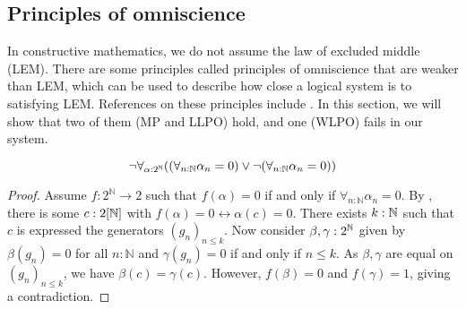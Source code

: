 \subsection{Principles of omniscience}
In constructive mathematics, we do not assume the law of excluded middle (LEM).
There are some principles called principles of omniscience that are weaker than LEM, which can be used to describe 
how close a logical system is to satisfying LEM.
References on these principles include \cite{HannesDiener, ReverseMathsBishop}.
In this section, we will show that two of them (MP and LLPO) hold, 
and one (WLPO) fails in our system.

\begin{theorem}\label{NotWLPO}
  \begin{equation}
    \neg \forall_{\alpha:2^{\mathbb{N}}} 
    ((\forall_{n:\mathbb{N}} \alpha_n = 0 ) \vee \neg (\forall_{n:\mathbb{N}} \alpha_n = 0))
  \end{equation}
\end{theorem}
\begin{proof}
  Assume $f:2^\mathbb N \to 2$ such that 
  $f(\alpha) = 0$ if and only if $\forall_{n:\mathbb N} \alpha_n= 0$. 
  By , there is some $c:2[\mathbb{N}]$ with 
  $f(\alpha) = 0 \leftrightarrow \alpha(c) = 0$. 
  There exists $k:\mathbb{N}$ such that $c$ is expressed the generators $(g_n)_{n\leq k}$. 
  Now consider $\beta,\gamma:2^{\mathbb{N}}$ given by 
  $\beta(g_n) = 0$ for all $n:\mathbb N$ and
  $\gamma(g_n) = 0$ if and only if $n\leq k$. 
  As $\beta, \gamma$ are equal on $(g_n)_{n\leq k}$, we have $\beta(c) = \gamma(c)$. 
  However, $f(\beta) = 0$ and $f(\gamma) = 1$, giving a contradiction. 
\end{proof}


